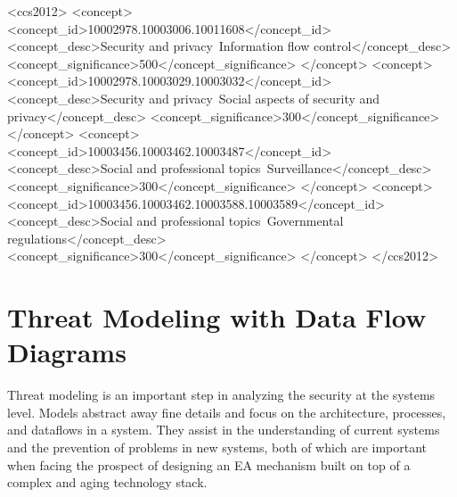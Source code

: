 \documentclass[manuscript,screen,review]{acmart}
\begin{document}
\begin{CCSXML}
<ccs2012>
  <concept>
    <concept_id>10002978.10003006.10011608</concept_id>
    <concept_desc>Security and privacy~Information flow control</concept_desc>
    <concept_significance>500</concept_significance>
  </concept>
  <concept>
    <concept_id>10002978.10003029.10003032</concept_id>
    <concept_desc>Security and privacy~Social aspects of security and privacy</concept_desc>
    <concept_significance>300</concept_significance>
  </concept>
    <concept>
    <concept_id>10003456.10003462.10003487</concept_id>
    <concept_desc>Social and professional topics~Surveillance</concept_desc>
    <concept_significance>300</concept_significance>
  </concept>
  <concept>
    <concept_id>10003456.10003462.10003588.10003589</concept_id>
    <concept_desc>Social and professional topics~Governmental regulations</concept_desc>
    <concept_significance>300</concept_significance>
  </concept>
</ccs2012>
\end{CCSXML}



\maketitle



\section{Threat Modeling with Data Flow Diagrams}
\label{sec-threat-model-intro}

Threat modeling is an important step in analyzing the security at the systems level. Models abstract away fine details
and focus on the architecture, processes, and dataflows in a system. They assist in the understanding of current systems
and the prevention of problems in new systems, both of which are important when facing the prospect of designing an
\ac{EA} mechanism built on top of a complex and aging technology stack.
\end{document}
